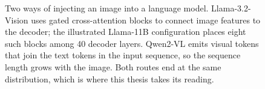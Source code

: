 \begin{figure}[htbp]
{}
\caption{Two ways of injecting an image into a language model.
Llama-3.2-Vision uses gated cross-attention blocks to connect image features
to the decoder; the illustrated Llama-11B configuration places eight such
blocks among 40 decoder layers. Qwen2-VL emits visual tokens that join the
text tokens in the input sequence, so the sequence length grows with the
image. Both routes end at the same distribution, which is where this thesis
takes its reading.}
\label{fig:fusion}
\end{figure}

